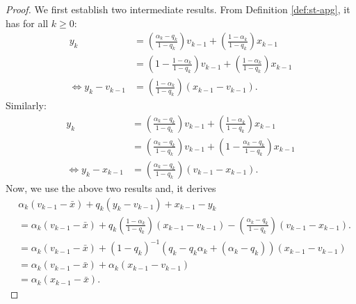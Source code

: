 \documentclass[12pt]{article}
\begin{document}
        \begin{proof}
            We first establish two intermediate results. 
            From Definition \ref{def:st-apg}, it has for all $k \ge 0$: 
            \begin{align*}
                y_k &= 
                \left(\frac{\alpha_k - q_k}{1 - q_k}\right)v_{k - 1} 
                + \left(\frac{1 - \alpha_k}{1 - q_k}\right) x_{k - 1}
                \\
                &= 
                \left(
                    1 - \frac{1 - \alpha_k}{1 - q_k}
                \right)v_{k - 1} 
                + \left(\frac{1 - \alpha_k}{1 - q_k}\right) x_{k - 1}
                \\
                \iff 
                y_k - v_{k - 1}
                &= \left(
                    \frac{1 - \alpha_k}{1 - q_k}
                \right)(x_{k - 1} - v_{k - 1}). 
            \end{align*}
            Similarly: 
            \begin{align*}
                y_k &= 
                \left(\frac{\alpha_k - q_k}{1 - q_k}\right)v_{k - 1} 
                + \left(\frac{1 - \alpha_k}{1 - q_k}\right) x_{k - 1}
                \\
                &= 
                \left(\frac{\alpha_k - q_k}{1 - q_k}\right)v_{k - 1} 
                + \left(1 - \frac{\alpha_k - q_k}{1 - q_k}\right) x_{k - 1}
                \\
                \iff 
                y_k - x_{k - 1} &= 
                \left(
                    \frac{\alpha_k - q_k}{1 - q_k}
                \right)(v_{k - 1} - x_{k - 1}). 
            \end{align*}
            Now, we use the above two results and, it derives 
            \begin{align*}
                & \alpha_k(v_{k - 1} - \bar x) 
                + q_k(y_k - v_{k - 1})
                + x_{k - 1} - y_k
                \\
                &=
                \alpha_k(v_{k - 1} - \bar x)
                + q_k\left(
                    \frac{1 - \alpha_k}{1 - q_k}
                \right)(x_{k - 1} - v_{k - 1})
                - \left(
                    \frac{\alpha_k - q_k}{1 - q_k}    
                \right)(v_{k - 1} - x_{k - 1}). 
                \\
                &= 
                \alpha_k(v_{k - 1} - \bar x)
                + (1 - q_k)^{-1}\left(
                    q_k - q_k\alpha_k +(\alpha_k - q_k)
                \right)
                (x_{k - 1} - v_{k - 1})
                \\
                &= 
                \alpha_k(v_{k - 1} - \bar x)
                + \alpha_k(x_{k - 1} - v_{k - 1})
                \\
                &= \alpha_k(x_{k - 1} - \bar x). 
            \end{align*}

        \end{proof}
\end{document}
